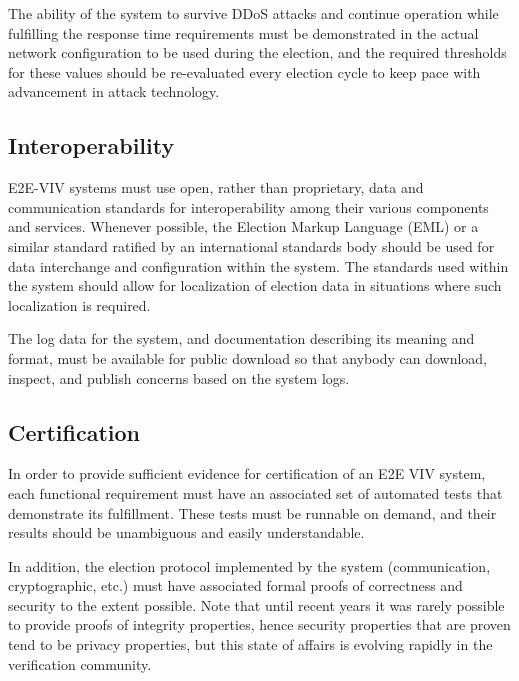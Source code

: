 The ability of the system to survive DDoS attacks and continue
operation while fulfilling the response time requirements must be
demonstrated in the actual network configuration to be used during the
election, and the required thresholds for these values should be
re-evaluated every election cycle to keep pace with advancement in
attack technology.

\subsection{Interoperability}
\label{sec:interoperability}

E2E-VIV systems must use open, rather than proprietary, data and
communication standards for interoperability among their various
components and services. Whenever possible, the Election Markup
Language (EML) or a similar standard ratified by an international
standards body should be used for data interchange and configuration
within the system. The standards used within the system should allow
for localization of election data in situations where such
localization is required.

The log data for the system, and documentation describing its meaning
and format, must be available for public download so that anybody can
download, inspect, and publish concerns based on the system logs. 

\subsection{Certification}

In order to provide sufficient evidence for certification of an E2E
VIV system, each functional requirement must have an associated set of
automated tests that demonstrate its fulfillment. These tests must be
runnable on demand, and their results should be unambiguous and easily
understandable.

In addition, the election protocol implemented by the system
(communication, cryptographic, etc.) must have associated formal
proofs of correctness and security to the extent possible. Note that
until recent years it was rarely possible to provide proofs of
integrity properties, hence security properties that are proven
tend to be privacy properties, but this state of affairs is evolving
rapidly in the verification community.

